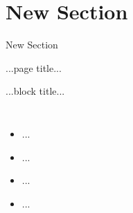 \section{New Section}

\bottomline{}
\begin{frame}
\centering \Huge New Section
\end{frame}

{
\begin{frame}{...page title...}
\centering
\begin{block}{...block title...}
\vspace{3mm}
\begin{columns}
\centering
[...graphics...]
\begin{itemize}
\item ...
\item ...
\item ...
\item ...
\end{itemize}
\end{columns}
\vspace{3mm}
\end{block}
\end{frame}
}

